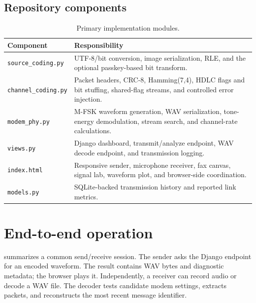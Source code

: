 \documentclass[11pt,a4paper]{article}
\begin{document}
\subsection{Repository components}
\begin{table}[ht]
\centering
\small
\begin{tabularx}{\textwidth}{@{}lX@{}}
\toprule
\textbf{Component} & \textbf{Responsibility} \\
\midrule
\texttt{source\_coding.py} & UTF-8/bit conversion, image serialization, RLE, and the optional passkey-based bit transform. \\
\texttt{channel\_coding.py} & Packet headers, CRC-8, Hamming(7,4), HDLC flags and bit stuffing, shared-flag streams, and controlled error injection. \\
\texttt{modem\_phy.py} & M-FSK waveform generation, WAV serialization, tone-energy demodulation, stream search, and channel-rate calculations. \\
\texttt{views.py} & Django dashboard, transmit/analyze endpoint, WAV decode endpoint, and transmission logging. \\
\texttt{index.html} & Responsive sender, microphone receiver, fax canvas, signal lab, waveform plot, and browser-side coordination. \\
\texttt{models.py} & SQLite-backed transmission history and reported link metrics. \\
\bottomrule
\end{tabularx}
\caption{Primary implementation modules.}
\label{tab:modules}
\end{table}

\section{End-to-end operation}
\label{sec:operation}

 summarizes a common send/receive session. The sender asks the Django endpoint for an encoded waveform. The result contains WAV bytes and diagnostic metadata; the browser plays it. Independently, a receiver can record audio or decode a WAV file. The decoder tests candidate modem settings, extracts packets, and reconstructs the most recent message identifier.
\end{document}
